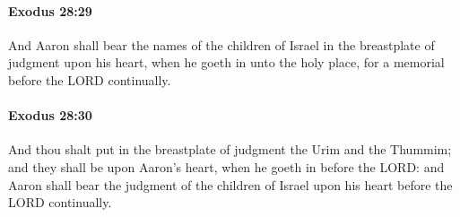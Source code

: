 		\paragraph{Exodus 28:29} %
			\label{EXODUS-28-29}

			And Aaron shall bear the names of the children of Israel in the breastplate of judgment upon his heart, when he goeth in unto the holy place, for a memorial before the LORD continually.


		\paragraph{Exodus 28:30} %
			\label{EXODUS-28-30}

			And thou shalt put in the breastplate of judgment the Urim and the Thummim; and they shall be upon Aaron's heart, when he goeth in before the LORD: and Aaron shall bear the judgment of the children of Israel upon his heart before the LORD continually.

